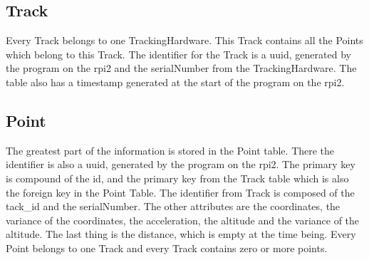 \subsection{Track}
Every Track belongs to one TrackingHardware. This Track contains all the Points which belong to this Track. The identifier for the Track is a \gls{uuid}, generated by the program on the \gls{rpi2} and the serialNumber from the TrackingHardware. The table also has a timestamp generated at the start of the program on the \gls{rpi2}.
\subsection{Point}
The greatest part of the information is stored in the Point table. There the identifier is also a \gls{uuid}, generated by the program on the \gls{rpi2}. The primary key is compound of the id, and the primary key from the Track table which is also the foreign key in the Point Table. The identifier from Track is composed of the tack\_id and the serialNumber. The other attributes are the coordinates, the variance of the coordinates, the acceleration, the altitude and the variance of the altitude. The last thing is the distance, which is empty at the time being. Every Point belongs to one Track and every Track contains zero or more points.
